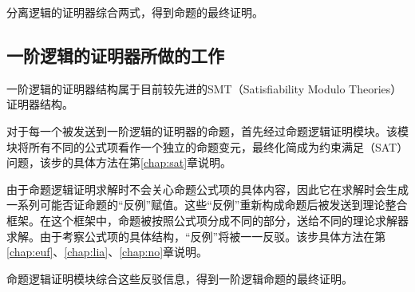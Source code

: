 分离逻辑的证明器综合两式，得到命题的最终证明。

\subsection{一阶逻辑的证明器所做的工作}
一阶逻辑的证明器结构属于目前较先进的SMT（Satisfiability Modulo Theories）证明器结构。

对于每一个被发送到一阶逻辑的证明器的命题，首先经过命题逻辑证明模块。该模块将所有不同的公式项看作一个独立的命题变元，最终化简成为约束满足（SAT）问题，该步的具体方法在第\ref{chap:sat}章说明。

由于命题逻辑证明求解时不会关心命题公式项的具体内容，因此它在求解时会生成一系列可能否证命题的``反例''赋值。这些``反例''重新构成命题后被发送到理论整合框架。在这个框架中，命题被按照公式项分成不同的部分，送给不同的理论求解器求解。由于考察公式项的具体结构，``反例''将被一一反驳。该步具体方法在第\ref{chap:euf}、\ref{chap:lia}、\ref{chap:no}章说明。

命题逻辑证明模块综合这些反驳信息，得到一阶逻辑命题的最终证明。
